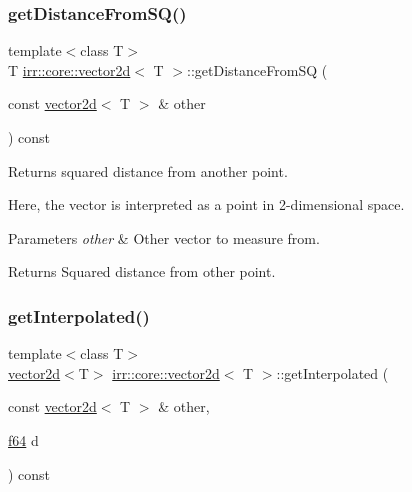 \subsubsection{\texorpdfstring{get\+Distance\+From\+S\+Q()}{getDistanceFromSQ()}\hspace{0.1cm}{\footnotesize\ttfamily [2/2]}}
{\footnotesize\ttfamily template$<$class T$>$ \\
T \hyperlink{classirr_1_1core_1_1vector2d}{irr\+::core\+::vector2d}$<$ T $>$\+::get\+Distance\+From\+SQ (\begin{DoxyParamCaption}\item[{const \hyperlink{classirr_1_1core_1_1vector2d}{vector2d}$<$ T $>$ \&}]{other }\end{DoxyParamCaption}) const\hspace{0.3cm}{\ttfamily [inline]}}



Returns squared distance from another point. 

Here, the vector is interpreted as a point in 2-\/dimensional space. 
\begin{DoxyParams}{Parameters}
{\em other} & Other vector to measure from. \\
\hline
\end{DoxyParams}
\begin{DoxyReturn}{Returns}
Squared distance from other point. 
\end{DoxyReturn}
\mbox{\label{classirr_1_1core_1_1vector2d_ac800722ea56bf8878dc7b67d490464c3}} 
\subsubsection{\texorpdfstring{get\+Interpolated()}{getInterpolated()}\hspace{0.1cm}{\footnotesize\ttfamily [1/2]}}
{\footnotesize\ttfamily template$<$class T$>$ \\
\hyperlink{classirr_1_1core_1_1vector2d}{vector2d}$<$T$>$ \hyperlink{classirr_1_1core_1_1vector2d}{irr\+::core\+::vector2d}$<$ T $>$\+::get\+Interpolated (\begin{DoxyParamCaption}\item[{const \hyperlink{classirr_1_1core_1_1vector2d}{vector2d}$<$ T $>$ \&}]{other,  }\item[{\hyperlink{namespaceirr_a1325b02603ad449f92c68fc640af9b28}{f64}}]{d }\end{DoxyParamCaption}) const\hspace{0.3cm}{\ttfamily [inline]}}



